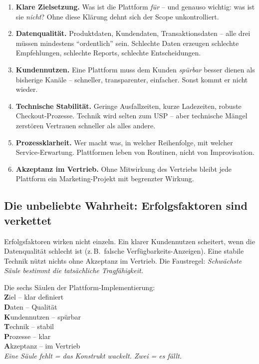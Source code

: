 \documentclass[11pt,a4paper,oneside]{article}
\newcommand{\caveatfontfallback}{\itshape}
\newcommand\caveatfont{\caveatfontfallback}%
\newcommand{\akzent}[1]{{\caveatfont\color{lpAmber}#1}}
\newcommand{\fachbegriff}[1]{\textbf{#1}}
\begin{document}
\begin{enumerate}
  \item \fachbegriff{Klare Zielsetzung.} Was ist die Plattform \emph{für} -- und genauso wichtig: was ist sie \emph{nicht}? Ohne diese Klärung dehnt sich der Scope unkontrolliert.
  \item \fachbegriff{Datenqualität.} Produktdaten, Kundendaten, Transaktionsdaten -- alle drei müssen mindestens ``ordentlich'' sein. Schlechte Daten erzeugen schlechte Empfehlungen, schlechte Reports, schlechte Entscheidungen.
  \item \fachbegriff{Kundennutzen.} Eine Plattform muss dem Kunden \emph{spürbar} besser dienen als bisherige Kanäle -- schneller, transparenter, einfacher. Sonst kommt er nicht wieder.
  \item \fachbegriff{Technische Stabilität.} Geringe Ausfallzeiten, kurze Ladezeiten, robuste Checkout-Prozesse. Technik wird selten zum USP -- aber technische Mängel zerstören Vertrauen schneller als alles andere.
  \item \fachbegriff{Prozessklarheit.} Wer macht was, in welcher Reihenfolge, mit welcher Service-Erwartung. Plattformen leben von Routinen, nicht von Improvisation.
  \item \fachbegriff{Akzeptanz im Vertrieb.} Ohne Mitwirkung des Vertriebs bleibt jede Plattform ein Marketing-Projekt mit begrenzter Wirkung.
\end{enumerate}

\subsection{Die unbeliebte Wahrheit: Erfolgsfaktoren sind verkettet}

Erfolgsfaktoren wirken nicht einzeln. Ein klarer Kundennutzen scheitert, wenn die Datenqualität schlecht ist (z.\,B.\ falsche Verfügbarkeits-Anzeigen). Eine stabile Technik nützt nichts ohne Akzeptanz im Vertrieb. Die Faustregel: \emph{Schwächste Säule bestimmt die tatsächliche Tragfähigkeit.}

\begin{eselsbox}[Eselsbrücke: \akzent{Z-D-K-T-P-A}]
Die sechs Säulen der Plattform-Implementierung:\\[2pt]
\textbf{Z}iel -- klar definiert\\
\textbf{D}aten -- Qualität\\
\textbf{K}undennutzen -- spürbar\\
\textbf{T}echnik -- stabil\\
\textbf{P}rozesse -- klar\\
\textbf{A}kzeptanz -- im Vertrieb\\[2pt]
\emph{Eine Säule fehlt = das Konstrukt wackelt. Zwei = es fällt.}
\end{eselsbox}
\end{document}
